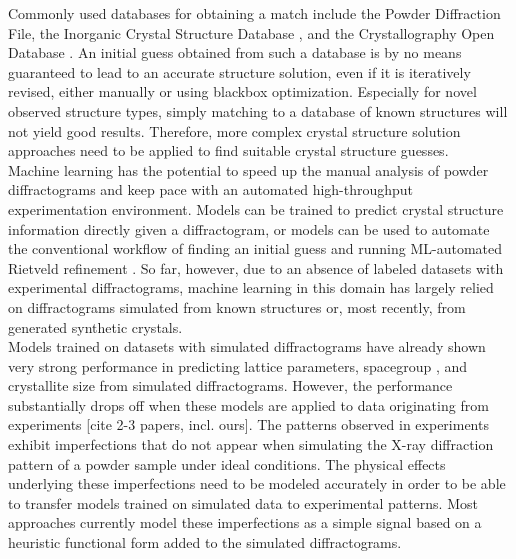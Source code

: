 Commonly used databases for obtaining a match include the Powder Diffraction File\cite{GatesRector2019}, the Inorganic Crystal Structure Database \cite{Belsky2002}, and the Crystallography Open Database \cite{Grazulis2009}. An initial guess obtained from such a database is by no means guaranteed to lead to an accurate structure solution, even if it is iteratively revised, either manually or using blackbox optimization\cite{Ozaki2020}. Especially for novel observed structure types, simply matching to a database of known structures will not yield good results. Therefore, more complex crystal structure solution approaches need to be applied to find suitable crystal structure guesses. \\


Machine learning has the potential to speed up the manual analysis of powder diffractograms and keep pace with an automated high-throughput experimentation environment\cite{Agrawal2019, Surdu2023}.
Models can be trained to predict crystal structure information directly given a diffractogram, or models can be used to automate the conventional workflow of finding an initial guess \cite{Surdu2023} and running ML-automated Rietveld refinement \cite{Feng2019}.
So far, however, due to an absence of labeled datasets with experimental diffractograms\cite{Wang2020}, machine learning in this domain has largely relied on diffractograms simulated from known structures\cite{Park2017, Lee2023} or, most recently, from generated synthetic crystals\cite{Schopmans2023}. \\

Models trained on datasets with simulated diffractograms have already shown very strong performance in predicting lattice parameters\cite{Dong2021, Chitturi2021, Habershon2004, zhang2024crystallographic}, spacegroup \cite{Schopmans2023, Oviedo2018, Park2017, Vecsei2018, Zaloga2020, Suzuki2020, Chakraborty2021,zhang2024crystallographic}, and crystallite size \cite{Dong2021, Chakraborty2021} from simulated diffractograms.
However, the performance substantially drops off when these models are applied to data originating from experiments \cite{Schopmans2023,zhang2024crystallographic}[cite 2-3 papers, incl. ours].
The patterns observed in experiments exhibit imperfections that do not appear when simulating the X-ray diffraction pattern of a powder sample under ideal conditions. The physical effects underlying these imperfections need to be modeled accurately in order to be able to transfer models trained on simulated data to experimental patterns. Most approaches currently model these imperfections as a simple signal based on a heuristic functional form added to the simulated diffractograms.

